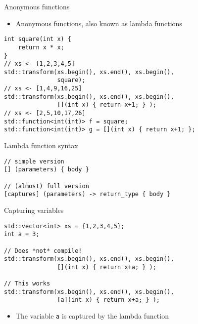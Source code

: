 \documentclass[10pt]{beamer}
\begin{document}
\begin{frame}[fragile,label={sec:org864d0b2}]{Anonymous functions}
 \begin{itemize}
\item Anonymous functions, also known as \alert{lambda} functions
\end{itemize}

\begin{verbatim}
int square(int x) {
    return x * x;
}
// xs <- [1,2,3,4,5]
std::transform(xs.begin(), xs.end(), xs.begin(),
               square);
// xs <- [1,4,9,16,25]
std::transform(xs.begin(), xs.end(), xs.begin(),
               [](int x) { return x+1; } );
// xs <- [2,5,10,17,26]
std::function<int(int)> f = square;
std::function<int(int)> g = [](int x) { return x+1; };
\end{verbatim}
\end{frame}

\begin{frame}[fragile,label={sec:org14c0c1d}]{Lambda function syntax}
 \begin{verbatim}
// simple version
[] (parameters) { body }

// (almost) full version
[captures] (parameters) -> return_type { body }
\end{verbatim}
\end{frame}

\begin{frame}[fragile,label={sec:orgc410187}]{Capturing variables}
 \begin{verbatim}
std::vector<int> xs = {1,2,3,4,5};
int a = 3;

// Does *not* compile!
std::transform(xs.begin(), xs.end(), xs.begin(),
               [](int x) { return x+a; } );

// This works
std::transform(xs.begin(), xs.end(), xs.begin(),
               [a](int x) { return x+a; } );
\end{verbatim}
\begin{itemize}
\item The variable \texttt{a} is \alert{captured} by the lambda function
\end{itemize}
\end{frame}
\end{document}
